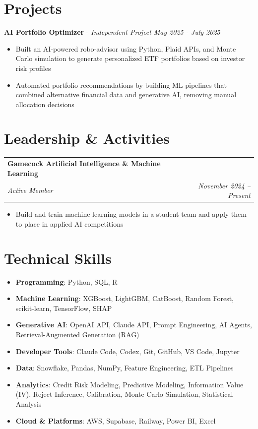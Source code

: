 \documentclass[letterpaper,10pt]{article}
\makeatletter
\newcommand{\localtextbulletone}{\textcolor{black}{\raisebox{.45ex}{\rule{.6ex}{.6ex}}}\hspace{8pt}}
\newcommand{\resumeItem}[2]{
  \item[\localtextbulletone]{
    \textbf{#1}{: #2}\\
  }\vspace{-4pt}
}
\newcommand{\resumeItemSimple}[1]{
  \vspace{0pt}
  \item[\localtextbulletone]{
    {#1}\\
  }\vspace{-4pt}
}
\newcommand{\resumeSubheading}[4]{
    \vspace{-1pt}
    \begin{tabular*}{1\textwidth}{l@{\extracolsep{\fill}}r}
      \textbf{#1} & #2 \\
      \textit{\small#3} & \textit{\small #4} \\
    \end{tabular*}\vspace{-5pt}
}
\newcommand{\resumeProject}[3]{
  \vspace{4pt}
  \textbf{#1} - \textit{#2} \hfill \textit{#3}\vspace{-2pt}
}
\newcommand{\resumeItemListStart}{\begin{itemize}[leftmargin=18pt,topsep=2pt,itemsep=2pt,parsep=0pt]}
\newcommand{\resumeItemListEnd}{\end{itemize}\vspace{-2pt}}
\makeatother
\begin{document}
\section{Projects}
  \resumeProject{AI Portfolio Optimizer}{Independent Project}{May 2025 - July 2025}
    \resumeItemListStart
      \resumeItemSimple
        {Built an AI-powered robo-advisor using Python, Plaid APIs, and Monte Carlo simulation to generate personalized ETF portfolios based on investor risk profiles}
      \resumeItemSimple
        {Automated portfolio recommendations by building ML pipelines that combined alternative financial data and generative AI, removing manual allocation decisions}
    \resumeItemListEnd

\section{Leadership \& Activities}
    \resumeSubheading
      {Gamecock Artificial Intelligence \& Machine Learning}{}
      {Active Member}{November 2024 – Present}
      \resumeItemListStart
        \resumeItemSimple
          {Build and train machine learning models in a student team and apply them to place in applied AI competitions}
      \resumeItemListEnd


\section{Technical Skills}
  \resumeItemListStart
    \resumeItem{Programming}
      {Python, SQL, R}
    \resumeItem{Machine Learning}
      {XGBoost, LightGBM, CatBoost, Random Forest, scikit-learn, TensorFlow, SHAP}
    \resumeItem{Generative AI}
      {OpenAI API, Claude API, Prompt Engineering, AI Agents, Retrieval-Augmented Generation (RAG)}
    \resumeItem{Developer Tools}
      {Claude Code, Codex, Git, GitHub, VS Code, Jupyter}
    \resumeItem{Data}
      {Snowflake, Pandas, NumPy, Feature Engineering, ETL Pipelines}
    \resumeItem{Analytics}
      {Credit Risk Modeling, Predictive Modeling, Information Value (IV), Reject Inference, Calibration, Monte Carlo Simulation, Statistical Analysis}
    \resumeItem{Cloud \& Platforms}
      {AWS, Supabase, Railway, Power BI, Excel}
  \resumeItemListEnd

\end{document}
